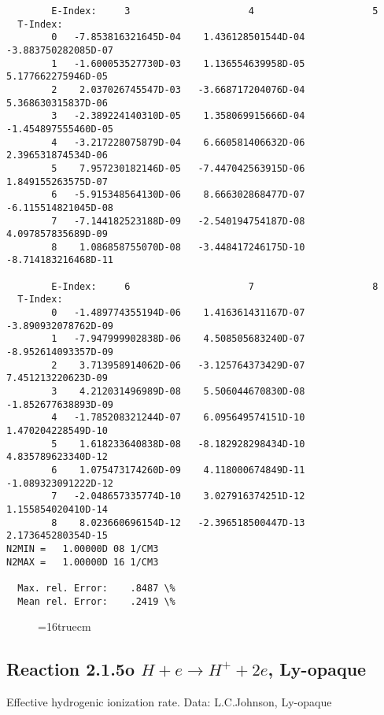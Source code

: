 \documentclass[12pt,dvipdfmx]{article}
\begin{document}
{\begin{small}
\begin{verbatim}
        E-Index:     3                     4                     5
  T-Index:
        0   -7.853816321645D-04    1.436128501544D-04   -3.883750282085D-07
        1   -1.600053527730D-03    1.136554639958D-05    5.177662275946D-05
        2    2.037026745547D-03   -3.668717204076D-04    5.368630315837D-06
        3   -2.389224140310D-05    1.358069915666D-04   -1.454897555460D-05
        4   -3.217228075879D-04    6.660581406632D-06    2.396531874534D-06
        5    7.957230182146D-05   -7.447042563915D-06    1.849155263575D-07
        6   -5.915348564130D-06    8.666302868477D-07   -6.115514821045D-08
        7   -7.144182523188D-09   -2.540194754187D-08    4.097857835689D-09
        8    1.086858755070D-08   -3.448417246175D-10   -8.714183216468D-11

        E-Index:     6                     7                     8
  T-Index:
        0   -1.489774355194D-06    1.416361431167D-07   -3.890932078762D-09
        1   -7.947999902838D-06    4.508505683240D-07   -8.952614093357D-09
        2    3.713958914062D-06   -3.125764373429D-07    7.451213220623D-09
        3    4.212031496989D-08    5.506044670830D-08   -1.852677638893D-09
        4   -1.785208321244D-07    6.095649574151D-10    1.470204228549D-10
        5    1.618233640838D-08   -8.182928298434D-10    4.835789623340D-12
        6    1.075473174260D-09    4.118000674849D-11   -1.089323091222D-12
        7   -2.048657335774D-10    3.027916374251D-12    1.155854020410D-14
        8    8.023660696154D-12   -2.396518500447D-13    2.173645280354D-15
N2MIN =   1.00000D 08 1/CM3
N2MAX =   1.00000D 16 1/CM3

  Max. rel. Error:    .8487 \%
  Mean rel. Error:    .2419 \%
\end{verbatim}\end{small}
\begin{figure} \label{2.1.5}
\epsfxsize=16truecm
\end{figure}
\newpage

\subsection{
Reaction 2.1.5o  $H + e \rightarrow H^+ + 2e $, Ly-opaque}


   Effective hydrogenic ionization rate. Data: L.C.Johnson, Ly-opaque

}
\end{document}
